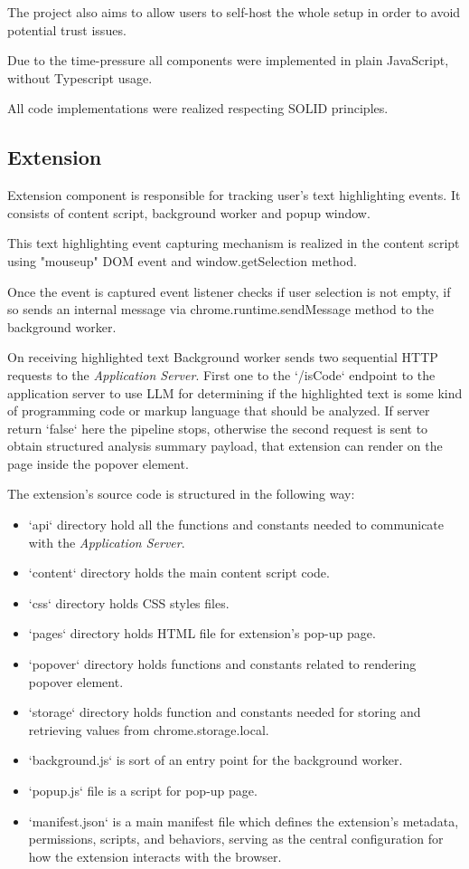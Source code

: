 The project also aims to allow users to self-host the whole setup in order to avoid
potential trust issues.

Due to the time-pressure all components were implemented in plain JavaScript,
without Typescript usage.

All code implementations were realized respecting SOLID \autocite{SOLID} principles.

\subsection{Extension}

Extension component is responsible for tracking user's text highlighting events.
It consists of content script, background worker and popup window.

This text highlighting event capturing mechanism is realized in the content script
using "mouseup" DOM \autocite{DOM} event and window.getSelection \autocite{GS}
method.

Once the event is captured event listener checks if user selection is not empty, if
so sends an internal message via chrome.runtime.sendMessage method to the background 
worker.

On receiving highlighted text Background worker sends two sequential HTTP
\autocite{HTTP} requests to the \emph{Application Server}. First one to the
`/isCode` endpoint to the application server to use LLM for determining if the
highlighted text is some kind of programming code or markup language that should be
analyzed. If server return `false` here the pipeline stops, otherwise the second
request is sent to obtain structured analysis summary payload, that extension
can render on the page inside the popover element.

The extension's source code is structured in the following way:
\begin{itemize}
    \item `api` directory hold all the functions and constants needed to
        communicate with the \emph{Application Server}.
    \item `content` directory holds the main content script code.
    \item `css` directory holds CSS styles files.
    \item `pages` directory holds HTML file for extension's pop-up page.
    \item `popover` directory holds functions and constants related to rendering
        popover element.
    \item `storage` directory holds function and constants needed for storing and
        retrieving values from chrome.storage.local.

    \item `background.js` is sort of an entry point for the background worker.
    \item `popup.js` file is a script for pop-up page.
    \item `manifest.json` is a main manifest file which defines the extension's
        metadata, permissions, scripts, and behaviors, serving as the central
        configuration for how the extension interacts with the browser.
\end{itemize}

